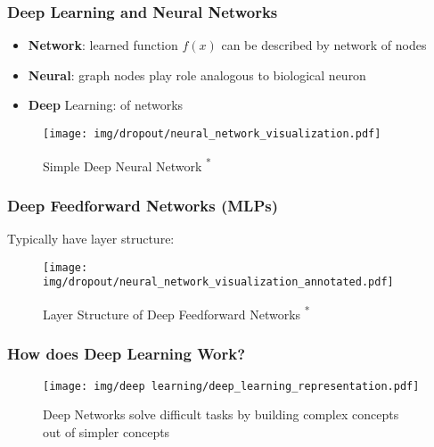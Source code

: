 \documentclass{beamer}
\begin{document}
\begin{frame}
    \frametitle{Deep Learning and Neural Networks}
    \begin{itemize}
        \item \textbf{Network}: learned function $f(x)$ can be described by network of nodes
        \item \textbf{Neural}: graph nodes play role analogous to biological neuron
        \item \textbf{Deep} Learning:  of networks
    \end{itemize}

    \begin{figure}
        \texttt{[image: img/dropout/neural\_network\_visualization.pdf]}
        \caption{Simple Deep Neural Network \cite{dropout}\textsuperscript{*}}
    \end{figure}
\end{frame}

\begin{frame}
    \frametitle{Deep Feedforward Networks (MLPs)}
    Typically have layer structure:
    \begin{figure}
        \texttt{[image: img/dropout/neural\_network\_visualization\_annotated.pdf]}
        \caption{Layer Structure of Deep Feedforward Networks \cite{dropout}\textsuperscript{*}}
    \end{figure}
\end{frame}

\begin{frame}
    \frametitle{How does Deep Learning Work?}
    \begin{figure}
        \begin{minipage}[c]{0.67\textwidth}
          \texttt{[image: img/deep learning/deep\_learning\_representation.pdf]}
        \end{minipage}\hfill
        \begin{minipage}[c]{0.3\textwidth}
          \caption{
            Deep Networks solve difficult tasks by building complex concepts out of simpler concepts \cite{textbook}
          } \label{fig:03-03}
        \end{minipage}
      \end{figure}
\end{frame}
\end{document}

